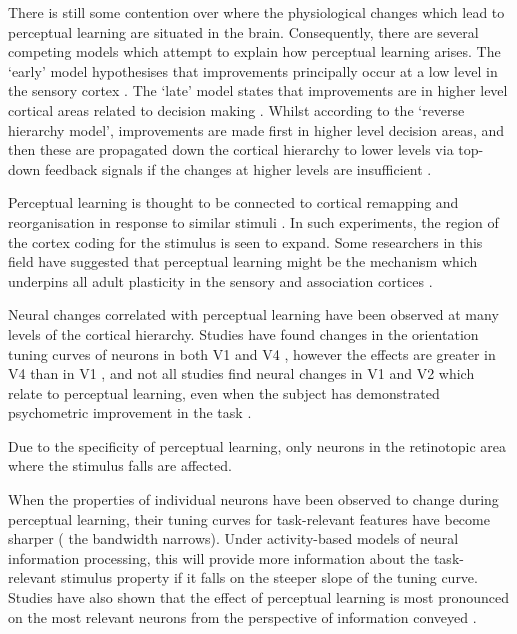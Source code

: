 There is still some contention over where the physiological changes which lead to perceptual learning are situated in the brain.
Consequently, there are several competing models which attempt to explain how perceptual learning arises.
The `early' model hypothesises that improvements principally occur at a low level in the sensory cortex \cite{Gilbert2001,Fahle2005}.
The `late' model states that improvements are in higher level cortical areas related to decision making \cite{Yu2004}.
Whilst according to the `reverse hierarchy model', improvements are made first in higher level decision areas, and then these are propagated down the cortical hierarchy to lower levels via top-down feedback signals if the changes at higher levels are insufficient \cite{Ahissar2004,Hochstein2002}.

Perceptual learning is thought to be connected to cortical remapping and reorganisation in response to similar stimuli \cite{Dinse2003,Pleger2003,Polley2006}.
In such experiments, the region of the cortex coding for the stimulus is seen to expand.
Some researchers in this field have suggested that perceptual learning might be the mechanism which underpins all adult plasticity in the sensory and association cortices \cite{Gilbert2001}.


Neural changes correlated with perceptual learning have been observed at many levels of the cortical hierarchy.
Studies have found changes in the orientation tuning curves of neurons in both \ac{V1} \cite{Schoups2001} and \ac{V4} \cite{Yang2004,Raiguel2006}, however the effects are greater in \ac{V4} than in \ac{V1} \cite{Raiguel2006}, and not all studies find neural changes in \ac{V1} and V2 which relate to perceptual learning, even when the subject has demonstrated psychometric improvement in the task \cite{Ghose2002}.

Due to the specificity of perceptual learning, only neurons in the retinotopic area where the stimulus falls are affected.

When the properties of individual neurons have been observed to change during perceptual learning, their tuning curves for task-relevant features have become sharper (\ie{} the bandwidth narrows).
Under activity-based models of neural information processing, this will provide more information about the task-relevant stimulus property if it falls on the steeper slope of the tuning curve.
Studies have also shown that the effect of perceptual learning is most pronounced on the most relevant neurons from the perspective of information conveyed \cite{Raiguel2006}.


